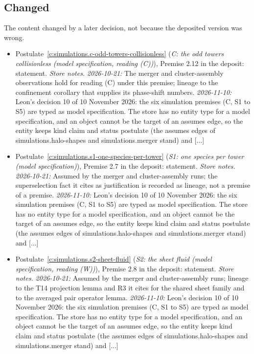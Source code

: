 \documentclass[11pt]{article}
\theoremstyle{definition}
\theoremstyle{plain}
\begin{document}
\subsection*{Changed}
The content changed by a later decision, not because the deposited version was wrong.
\begin{itemize}\setlength{\itemsep}{2pt}
\item Postulate~\ref{c:simulations.c-odd-towers-collisionless} (\emph{C: the odd towers collisionless (model specification, reading (C))}), Premise 2.12 in the deposit: statement. \emph{Store notes.} \emph{2026-10-21:} The merger and cluster-assembly observations hold for reading (C) under this premise; lineage to the confinement corollary that supplies its phase-shift numbers. \emph{2026-11-10:} Leon's decision 10 of 10 November 2026: the six simulation premises (C, S1 to S5) are typed as model specification. The store has no entity type for a model specification, and an object cannot be the target of an assumes edge, so the entity keeps kind claim and status postulate (the assumes edges of simulations.halo-shapes and simulations.merger stand) and [...]
\item Postulate~\ref{c:simulations.s1-one-species-per-tower} (\emph{S1: one species per tower (model specification)}), Premise 2.7 in the deposit: statement. \emph{Store notes.} \emph{2026-10-21:} Assumed by the merger and cluster-assembly runs; the superselection fact it cites as justification is recorded as lineage, not a premise of a premise. \emph{2026-11-10:} Leon's decision 10 of 10 November 2026: the six simulation premises (C, S1 to S5) are typed as model specification. The store has no entity type for a model specification, and an object cannot be the target of an assumes edge, so the entity keeps kind claim and status postulate (the assumes edges of simulations.halo-shapes and simulations.merger stand) and [...]
\item Postulate~\ref{c:simulations.s2-sheet-fluid} (\emph{S2: the sheet fluid (model specification, reading (W))}), Premise 2.8 in the deposit: statement. \emph{Store notes.} \emph{2026-10-21:} Assumed by the merger and cluster-assembly runs; lineage to the T14 projection lemma and R3 it cites for the shared sheet family and to the averaged pair operator lemma. \emph{2026-11-10:} Leon's decision 10 of 10 November 2026: the six simulation premises (C, S1 to S5) are typed as model specification. The store has no entity type for a model specification, and an object cannot be the target of an assumes edge, so the entity keeps kind claim and status postulate (the assumes edges of simulations.halo-shapes and simulations.merger stand) and [...]

\end{itemize}
\end{document}
